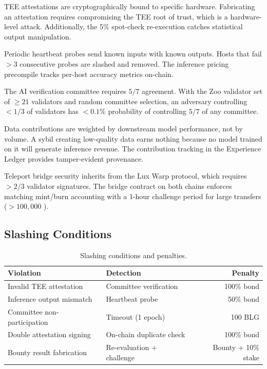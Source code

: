 \begin{description}[style=nextline]
    \item[Against malicious trainers] TEE attestations are cryptographically bound to specific hardware. Fabricating an attestation requires compromising the TEE root of trust, which is a hardware-level attack. Additionally, the 5\% spot-check re-execution catches statistical output manipulation.

    \item[Against malicious hosts] Periodic heartbeat probes send known inputs with known outputs. Hosts that fail $> 3$ consecutive probes are slashed and removed. The inference pricing precompile tracks per-host accuracy metrics on-chain.

    \item[Against colluding validators] The AI verification committee requires $5/7$ agreement. With the Zoo validator set of $\geq 21$ validators and random committee selection, an adversary controlling $< 1/3$ of validators has $< 0.1\%$ probability of controlling $5/7$ of any committee.

    \item[Against sybil data contributors] Data contributions are weighted by downstream model performance, not by volume. A sybil creating low-quality data earns nothing because no model trained on it will generate inference revenue. The contribution tracking in the Experience Ledger \cite{zoo-experience-ledger} provides tamper-evident provenance.

    \item[Against bridge attackers] Teleport bridge security inherits from the Lux Warp protocol, which requires $> 2/3$ validator signatures. The bridge contract on both chains enforces matching mint/burn accounting with a 1-hour challenge period for large transfers ($> 100{,}000$ \BLG{}).
\end{description}

\subsection{Slashing Conditions}

\begin{table}[h]
\centering
\caption{Slashing conditions and penalties.}
\label{tab:slashing}
\begin{tabular}{@{}llr@{}}
\toprule
Violation & Detection & Penalty \\
\midrule
Invalid TEE attestation & Committee verification & 100\% bond \\
Inference output mismatch & Heartbeat probe & 50\% bond \\
Committee non-participation & Timeout (1 epoch) & 100 BLG \\
Double attestation signing & On-chain duplicate check & 100\% bond \\
Bounty result fabrication & Re-evaluation + challenge & Bounty + 10\% stake \\
\bottomrule
\end{tabular}
\end{table}

